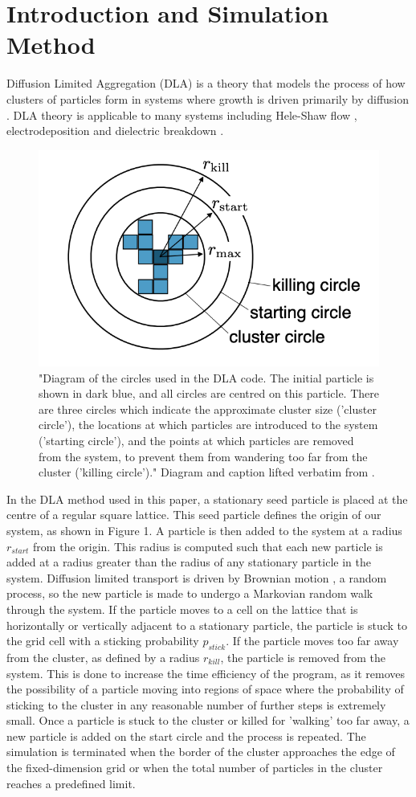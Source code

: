 \documentclass[11pt]{iopart}
\begin{document}
\section{Introduction and Simulation Method}

Diffusion Limited Aggregation (DLA) is a theory that models the process of how clusters of particles form in systems where growth is driven primarily by diffusion \cite{dla}. DLA theory is applicable to many systems including Hele-Shaw flow \cite{heleshaw}, electrodeposition \cite{electrodeposition} and dielectric breakdown \cite{electricbreakdown}.

\begin{figure}[t]
  \centering
  \includegraphics[width=0.4\linewidth]{images/circles.png}
  \caption{"Diagram of the circles used in the DLA code. The initial particle is shown in dark blue, and all circles are centred on this particle. There are three circles which indicate the approximate cluster size ('cluster circle'), the locations at which particles are introduced to the system ('starting circle'), and the points at which particles are removed from the system, to prevent them from wandering too far from the cluster ('killing circle')." Diagram and caption lifted verbatim from \cite{handout}.}
  \label{fig:circles}
\end{figure}

In the DLA method used in this paper, a stationary seed particle is placed at the centre of a regular square lattice. This seed particle defines the origin of our system, as shown in Figure 1. A particle is then added to the system at a radius $r_{start}$ from the origin. This radius is computed such that each new particle is added at a radius greater than the radius of any stationary particle in the system. Diffusion limited transport is driven by Brownian motion \cite{brownian}, a random process, so the new particle is made to undergo a Markovian random walk through the system. If the particle moves to a cell on the lattice that is horizontally or vertically adjacent to a stationary particle, the particle is stuck to the grid cell with a sticking probability $p_{stick}$. If the particle moves too far away from the cluster, as defined by a radius $r_{kill}$, the particle is removed from the system. This is done to increase the time efficiency of the program, as it removes the possibility of a particle moving into regions of space where the probability of sticking to the cluster in any reasonable number of further steps is extremely small. Once a particle is stuck to the cluster or killed for 'walking' too far away, a new particle is added on the start circle and the process is repeated. The simulation is terminated when the border of the cluster approaches the edge of the fixed-dimension grid or when the total number of particles in the cluster reaches a predefined limit.
\end{document}
